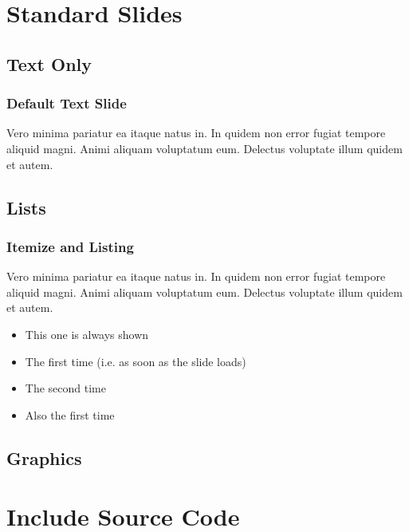 
\section{Standard Slides}\label{sec:standard-slides}

\subsection{Text Only}\label{ssec:text-only}

\begin{frame}
	\frametitle{Default Text Slide}
	Vero minima pariatur ea itaque natus in. In quidem non error fugiat tempore aliquid magni. Animi aliquam voluptatum eum. Delectus voluptate illum quidem et autem.
\end{frame}

\subsection{Lists}\label{ssec:lists}

\begin{frame}
	\frametitle{Itemize and Listing}
	Vero minima pariatur ea itaque natus in. In quidem non error fugiat tempore aliquid magni. Animi aliquam voluptatum eum.
	\pause
	 Delectus voluptate illum quidem et autem.

	\begin{itemize}[<+->]
		\item This one is always shown
		\item The first time (i.e. as soon as the slide loads)
		\item The second time
		\item Also the first time
	\end{itemize}
\end{frame}

\subsection{Graphics}\label{ssec:graphics}


\section{Include Source Code}\label{sec:include-source-code}

